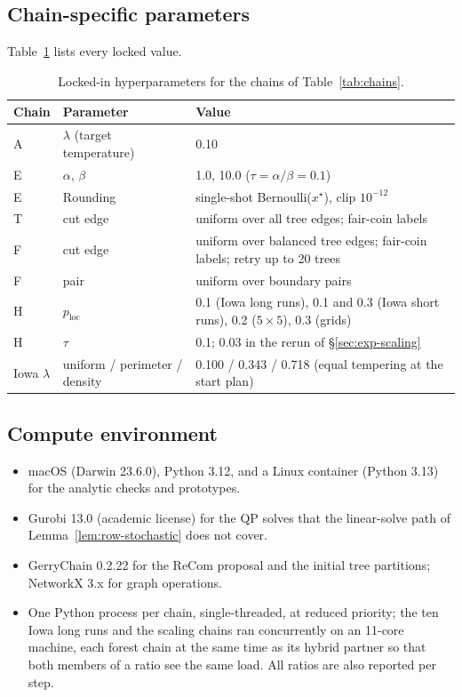 \documentclass[11pt]{article}
\begin{document}
\subsection{Chain-specific parameters}\label{app:chains}

Table~\ref{tab:hyperparams} lists every locked value.

\begin{table}[htbp]
\centering
\footnotesize
\begin{tabular}{lll}
\toprule
Chain & Parameter & Value \\
\midrule
A & $\lambda$ (target temperature) & 0.10 \\
E & $\alpha$, $\beta$ & 1.0, 10.0 ($\tau = \alpha/\beta = 0.1$) \\
E & Rounding & single-shot Bernoulli($x^\star$), clip $10^{-12}$ \\
T & cut edge & uniform over all tree edges; fair-coin labels \\
F & cut edge & uniform over balanced tree edges; fair-coin labels; retry up to 20 trees \\
F & pair & uniform over boundary pairs \\
H & $p_{\mathrm{loc}}$ & 0.1 (Iowa long runs), 0.1 and 0.3 (Iowa short runs), 0.2 ($5 \times 5$), 0.3 (grids) \\
H & $\tau$ & 0.1; 0.03 in the rerun of \S\ref{sec:exp-scaling} \\
Iowa $\lambda$ & uniform / perimeter / density & 0.100 / 0.343 / 0.718 (equal tempering at the start plan) \\
\bottomrule
\end{tabular}
\caption{Locked-in hyperparameters for the chains of
  Table~\ref{tab:chains}.}\label{tab:hyperparams}
\end{table}

\subsection{Compute environment}\label{app:compute}

\begin{itemize}
  \item macOS (Darwin 23.6.0), Python 3.12, and a Linux container
    (Python 3.13) for the analytic checks and prototypes.
  \item Gurobi 13.0 (academic license) for the QP solves that the
    linear-solve path of Lemma~\ref{lem:row-stochastic} does not
    cover.
  \item GerryChain 0.2.22 for the ReCom proposal and the initial tree
    partitions; NetworkX 3.x for graph operations.
  \item One Python process per chain, single-threaded, at reduced
    priority; the ten Iowa long runs and the scaling chains ran
    concurrently on an 11-core machine, each forest chain at the same
    time as its hybrid partner so that both members of a ratio see
    the same load. All ratios are also reported per step.
\end{itemize}
\end{document}
